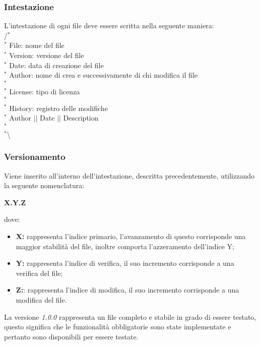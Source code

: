 \subsubsection{Intestazione}
L'intestazione di ogni file deve essere scritta nella seguente maniera: \\
/$^{*}$\\
$^{*}$ File: nome del file \\
$^{*}$ Version: versione del file \\
$^{*}$ Date: data di creazione del file \\
$^{*}$ Author: nome di crea e successivamente di chi modifica il file \\
$^{*}$ \\
$^{*}$ License: tipo di licenza \\
$^{*}$ \\
$^{*}$ History: registro delle modifiche \\
$^{*}$ Author $\vert$$\vert$ Date $\vert$$\vert$ Description \\
$^{*}$ \\
$^{*}$\textbackslash

\subsubsection{Versionamento}
Viene inserito all'interno dell'intestazione, descritta precedentemente, utilizzando la seguente nomenclatura:
\begin{center}
	\textbf{X.Y.Z}
\end{center}
dove:
\begin{itemize}
	\item \textbf{X:} rappresenta l'indice primario, l'avanzamento di questo corrisponde una maggior stabilità del file, inoltre comporta l'azzeramento dell'indice Y;
	\item \textbf{Y:} rappresenta l'indice di verifica, il suo incremento corrisponde a una verifica del file;
	\item \textbf{Z:}: rappresenta l'indice di modifica, il suo incremento corrisponde a una modifica del file.
\end{itemize}
La versione \textit{1.0.0} rappresenta un file completo e stabile in grado di essere testato, questo significa che le funzionalità obbligatorie sono state implementate e pertanto sono disponibili per essere testate.





